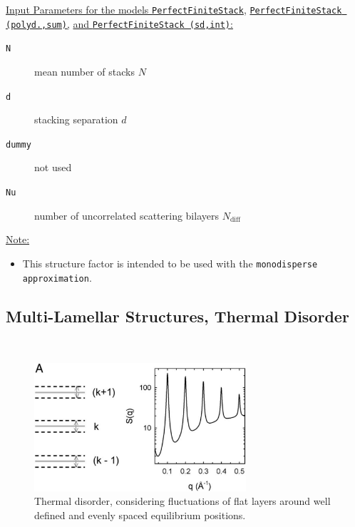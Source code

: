 \noindent
\underline{Input Parameters for the models \texttt{PerfectFiniteStack},} \underline{\texttt{PerfectFiniteStack (polyd.,sum)},} \underline{and \texttt{PerfectFiniteStack (sd,int)}:}
\begin{description}
\item[\texttt{N}] mean number of stacks $N$
\item[\texttt{d}] stacking separation $d$
\item[\texttt{dummy}]  not used
\item[\texttt{Nu}] number of uncorrelated scattering bilayers $N_\text{diff}$
\end{description}

\noindent\underline{Note:}
\begin{itemize}
\item This structure factor is intended to be used with the \texttt{monodisperse approximation}.
\end{itemize}


\subsection{Multi-Lamellar Structures, Thermal Disorder} \hspace{1pt}\\

\begin{figure}[htb]
\begin{center}
\includegraphics[width=0.7\textwidth]{ThermalDisorderSQ.png}
\end{center}
\caption{Thermal disorder, considering fluctuations of flat layers
around well defined and evenly spaced equilibrium positions.}
\label{ThermalDisorderSQ}
\end{figure}

